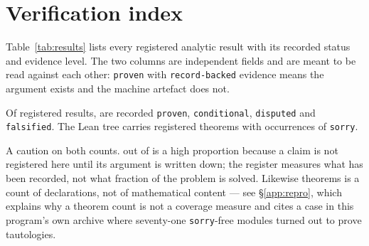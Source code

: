 \section{Verification index}
\label{app:verification}

Table~\ref{tab:results} lists every registered analytic result with its
recorded status and evidence level. The two columns are independent
fields and are meant to be read against each other: \texttt{proven} with
\texttt{record-backed} evidence means the argument exists and the machine
artefact does not.

Of \ResTotal{} registered results, \ResProven{} are recorded
\texttt{proven}, \ResConditional{} \texttt{conditional},
\ResDisputed{} \texttt{disputed} and \ResFalsified{} \texttt{falsified}.
The Lean tree carries \LeanTotal{} registered theorems with
\LeanSorry{} occurrences of \texttt{sorry}.

A caution on both counts. \ResProven{} out of \ResTotal{} is a high
proportion because a claim is not registered here until its argument is
written down; the register measures what has been recorded, not what
fraction of the problem is solved. Likewise \LeanTotal{} theorems is a
count of declarations, not of mathematical content --- see
\S\ref{app:repro}, which explains why a theorem count is not a coverage
measure and cites a case in this program's own archive where seventy-one
\texttt{sorry}-free modules turned out to prove tautologies.


